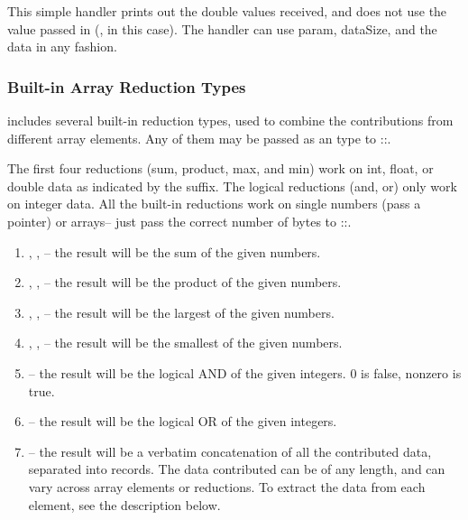 This simple handler prints out the double values received, and does not use the  value passed in (, in this case).  The handler can use param, dataSize, and the data in any fashion.


\subsubsection{Built-in Array Reduction Types}
\charmpp includes several built-in reduction types, used to combine the contributions from different array elements.  Any of them may be passed as an  type to ::.

The first four reductions (sum, product, max, and min) work on int, float, or double data as indicated by the suffix.  The logical reductions (and, or) only work on integer data.  All the built-in reductions work on single numbers (pass a pointer) or arrays-- just pass the correct number of bytes to ::.

\begin{enumerate}
\item {}, , -- the result will be the sum of the given numbers.

\item {}, , -- the result will be the product of the given numbers.

\item {}, , -- the result will be the largest of the given numbers.

\item {}, , -- the result will be the smallest of the given numbers.

\item {}-- the result will be the logical AND of the given integers.  0 is false, nonzero is true.

\item {}-- the result will be the logical OR of the given integers.

\item {}-- the result will be a verbatim concatenation of all the contributed data, separated into  records.  The data contributed can be of any length, and can vary across array elements or reductions.  To extract the data from each element, see the description below.

\end{enumerate}


